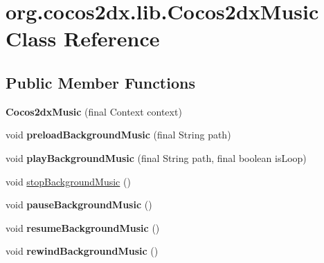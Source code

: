 \hypertarget{classorg_1_1cocos2dx_1_1lib_1_1Cocos2dxMusic}{}\section{org.\+cocos2dx.\+lib.\+Cocos2dx\+Music Class Reference}
\label{classorg_1_1cocos2dx_1_1lib_1_1Cocos2dxMusic}
\subsection*{Public Member Functions}
\begin{DoxyCompactItemize}
\item 
\mbox{\label{classorg_1_1cocos2dx_1_1lib_1_1Cocos2dxMusic_a9d1af5550c940cc0efa0d6f8f9b351b0}} 
{\bfseries Cocos2dx\+Music} (final Context context)
\item 
\mbox{\label{classorg_1_1cocos2dx_1_1lib_1_1Cocos2dxMusic_a62c7793fbe6ea8118849c04eea5adfb5}} 
void {\bfseries preload\+Background\+Music} (final String path)
\item 
\mbox{\label{classorg_1_1cocos2dx_1_1lib_1_1Cocos2dxMusic_ad7226e826a98984486d4e6939d017c24}} 
void {\bfseries play\+Background\+Music} (final String path, final boolean is\+Loop)
\item 
void \hyperlink{classorg_1_1cocos2dx_1_1lib_1_1Cocos2dxMusic_a0f376e36d6226ced411843f49c518d91}{stop\+Background\+Music} ()
\item 
\mbox{\label{classorg_1_1cocos2dx_1_1lib_1_1Cocos2dxMusic_a8e276f0881017f8b2e9923f87f67995a}} 
void {\bfseries pause\+Background\+Music} ()
\item 
\mbox{\label{classorg_1_1cocos2dx_1_1lib_1_1Cocos2dxMusic_ad54aeeecc2814e5eb60caa23500b0cd1}} 
void {\bfseries resume\+Background\+Music} ()
\item 
\mbox{\label{classorg_1_1cocos2dx_1_1lib_1_1Cocos2dxMusic_a9a7d5d7f2b3307edc23a0b158323b1a4}} 
void {\bfseries rewind\+Background\+Music} ()

\end{DoxyCompactItemize}

